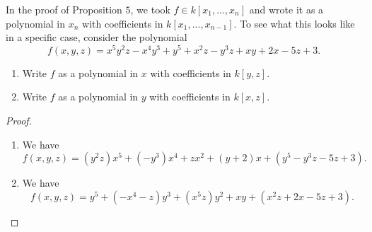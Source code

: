 \begin{exercise}{5}
In the proof of Proposition $5$, we took $f\in k[x_1,...,x_n]$ and wrote it as a polynomial in $x_n$ with coefficients in $k[x_1,...,x_{n-1}]$. To see what this looks like in a specific case, consider the polynomial
$$f(x,y,z) = x^5 y^2 z - x^4 y^3 + y^5 + x^2 z - y^3 z + xy + 2x - 5z + 3.$$
\begin{enumerate}
    \item Write $f$ as a polynomial in $x$ with coefficients in $k[y,z]$.
    \item Write $f$ as a polynomial in $y$ with coefficients in $k[x,z]$.
\end{enumerate}
\end{exercise}
\begin{proof}
    \begin{enumerate}
        \item We have
        $$f(x,y,z) = (y^2 z)x^5 + (-y^3)x^4 + z x^2 + (y + 2)x + (y^5 - y^3 z - 5z + 3).$$
        \item We have
        $$f(x,y,z) = y^5 + (-x^4 - z)y^3 + (x^5 z)y^2 + xy + (x^2 z + 2x - 5z + 3).$$
    \end{enumerate}
\end{proof}
